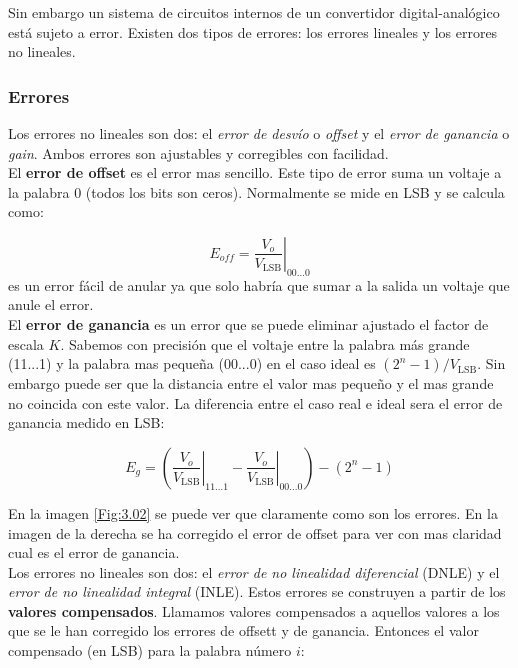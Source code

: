 \documentclass[12pt,a4paper]{article}
\numberwithin{equation}{section}
\numberwithin{figure}{section}
\newcommand{\parentesis}[1]{\left( #1  \right)}
\newcommand{\LSB}{\mathrm{LSB}}
\begin{document}
Sin embargo un sistema de circuitos internos de un convertidor digital-analógico está sujeto a error. Existen dos tipos de errores: los errores lineales y los errores no lineales. 

\subsubsection{Errores}

Los errores no lineales son dos: el \textit{error de desvío} o \textit{offset} y el \textit{error de ganancia} o \textit{gain}. Ambos errores son ajustables y corregibles con facilidad. \\

El \textbf{error de offset} es el error mas sencillo. Este tipo de error suma un voltaje a la palabra 0 (todos los bits son ceros). Normalmente se mide en LSB y se calcula como:

\begin{equation}
E_{off} = \left. \dfrac{V_o}{V_{\mathrm{LSB}}} \right|_{00 \ldots 0}
\end{equation}
es un error fácil de anular ya que solo habría que sumar a la salida un voltaje que anule el error. \\

El \textbf{error de ganancia} es un error que se puede eliminar ajustado el factor de escala $K$. Sabemos con precisión que el voltaje entre la palabra más grande (11...1) y la palabra mas pequeña (00...0) en el caso ideal es $(2^n-1)/V_\LSB$. Sin embargo puede ser que la distancia entre el valor mas pequeño y el mas grande no coincida con este valor. La diferencia entre el caso real e ideal sera el error de ganancia medido en LSB:

\begin{equation}
E_g = \parentesis{\left. \dfrac{V_o}{V_{\mathrm{LSB}}} \right|_{11 \ldots 1} - \left. \dfrac{V_o}{V_{\mathrm{LSB}}} \right|_{00 \ldots 0}} - (2^n-1)
\end{equation}

En la imagen \ref{Fig:3.02} se puede ver que claramente como son los errores. En la imagen de la derecha se ha corregido el error de offset para ver con mas claridad cual es el error de ganancia. \\

Los errores no lineales son dos: el \textit{error de no linealidad diferencial} (DNLE) y el \textit{error de no linealidad integral} (INLE). Estos errores se construyen a partir de los \textbf{valores compensados}. Llamamos valores compensados a aquellos valores a los que se le han corregido los errores de offsett y de ganancia. Entonces el valor compensado (en LSB) para la palabra número $i$:
\end{document}
